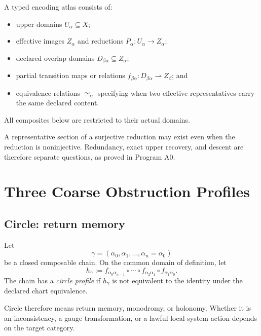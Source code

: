 \documentclass[11pt]{article}
\begin{document}
\begin{definition}\label{def:atlas}
A typed encoding atlas consists of:
\begin{itemize}
\item upper domains $U_\alpha\subseteq X$;
\item effective images $Z_\alpha$ and reductions
$P_\alpha:U_\alpha\to Z_\alpha$;
\item declared overlap domains $D_{\beta\alpha}\subseteq Z_\alpha$;
\item partial transition maps or relations
$f_{\beta\alpha}:D_{\beta\alpha}\rightharpoonup Z_\beta$; and
\item equivalence relations $\simeq_\alpha$ specifying when two effective
representatives carry the same declared content.
\end{itemize}
All composites below are restricted to their actual domains.
\end{definition}

\begin{remark}
A representative section of a surjective reduction may exist even when the
reduction is noninjective.  Redundancy, exact upper recovery, and descent are
therefore separate questions, as proved in Program A0.
\end{remark}

\section{Three Coarse Obstruction Profiles}

\subsection{Circle: return memory}

\begin{definition}\label{def:circle}
Let
\[
\gamma=(\alpha_0,\alpha_1,\ldots,\alpha_n=\alpha_0)
\]
be a closed composable chain.  On the common domain of definition, let
\[
h_\gamma
:=
f_{\alpha_0\alpha_{n-1}}\circ\cdots\circ
f_{\alpha_2\alpha_1}\circ f_{\alpha_1\alpha_0}.
\]
The chain has a \emph{circle profile} if $h_\gamma$ is not equivalent to the
identity under the declared chart equivalence.
\end{definition}

Circle therefore means return memory, monodromy, or holonomy.  Whether it is an
inconsistency, a gauge transformation, or a lawful local-system action depends
on the target category.
\end{document}

